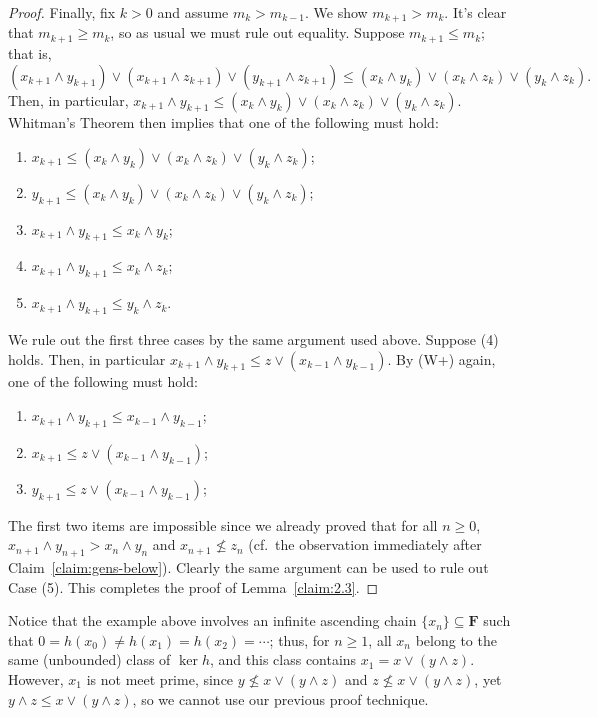 \begin{proof}
Finally, fix $k> 0$ and assume $m_k > m_{k-1}$.  We show $m_{k+1} > m_k$.
It's clear that $m_{k+1} \geq m_k$, so as usual we must rule out equality.  Suppose
$m_{k+1} \leq m_k$; that is,
\[
(x_{k+1} \wedge y_{k+1}) \vee (x_{k+1} \wedge z_{k+1}) \vee (y_{k+1} \wedge z_{k+1}) \leq
(x_k \wedge y_k) \vee (x_k \wedge z_k) \vee (y_k \wedge z_k).
\]
Then, in particular, $x_{k+1} \wedge y_{k+1} \leq (x_k \wedge y_k) \vee (x_k \wedge z_k) \vee (y_k \wedge z_k)$.
Whitman's Theorem then implies that one of the following must hold:
\begin{enumerate}
\item $x_{k+1}\leq (x_k \wedge y_k) \vee (x_k \wedge z_k) \vee (y_k \wedge z_k)$;
\item $y_{k+1} \leq (x_k \wedge y_k) \vee (x_k \wedge z_k) \vee (y_k \wedge z_k)$;
\item $x_{k+1} \wedge y_{k+1} \leq x_k \wedge y_k$;
\item $x_{k+1} \wedge y_{k+1} \leq x_k \wedge z_k$;
\item $x_{k+1} \wedge y_{k+1} \leq y_k \wedge z_k$.
\end{enumerate}
We rule out the first three cases by the same argument used above.
Suppose (4) holds.  Then, in particular
$x_{k+1} \wedge y_{k+1} \leq z\vee (x_{k-1} \wedge y_{k-1})$.
By (W+) again, one of the following must hold:
\begin{enumerate}
\item $x_{k+1} \wedge y_{k+1} \leq x_{k-1} \wedge y_{k-1}$;
\item $x_{k+1} \leq z\vee (x_{k-1} \wedge y_{k-1})$;
\item $y_{k+1} \leq z\vee (x_{k-1} \wedge y_{k-1})$;
\end{enumerate}
The first two items are impossible since we already proved that for all $n\geq 0$, 
$x_{n+1} \wedge y_{n+1} > x_{n} \wedge y_n$ and  $x_{n+1} \nleq z_n$ 
(cf.~the observation immediately after Claim~\ref{claim:gens-below}).
Clearly the same argument can be used to rule out Case (5).
This completes the proof of Lemma~\ref{claim:2.3}.
\end{proof}




Notice that the example above involves an infinite ascending chain $\{x_n\} \subseteq \mathbf F$
such that $0 = h(x_0) \neq h(x_1) = h(x_2) = \cdots$; thus, for $n\geq 1$, all $x_n$ belong to the same 
(unbounded) class of $\ker h$, and this class contains $x_1 = x \vee (y \wedge z)$.
However, $x_1$ is not meet prime, since $y \nleq x \vee (y \wedge z)$ and $z \nleq x \vee (y \wedge z)$, yet 
$y \wedge z \leq x \vee (y \wedge z)$, so we cannot use our previous proof technique.

